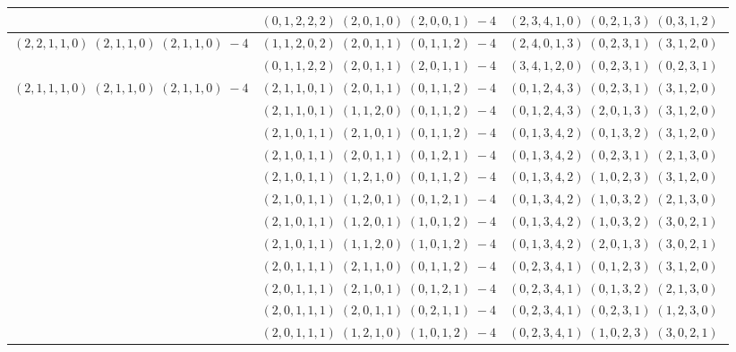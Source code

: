\documentclass[11pt]{article}
\begin{document}
\begin{longtable}[l]{|c|c|c|}
 \cline{2-3} 
 & $(0 ,1 ,2 ,2 ,2) \;(2 ,0 ,1 ,0) \;(2 ,0 ,0 ,1) \;-4$ & $(2 ,3 ,4 ,1 ,0) \;(0 ,2 ,1 ,3) \;(0 ,3 ,1 ,2) \;$\\ \hline\multirow[t]{2}{*}{ $(2 ,2 ,1 ,1 ,0) \;(2 ,1 ,1 ,0) \;(2 ,1 ,1 ,0) \;-4$ }  & $(1 ,1 ,2 ,0 ,2) \;(2 ,0 ,1 ,1) \;(0 ,1 ,1 ,2) \;-4$ & $(2 ,4 ,0 ,1 ,3) \;(0 ,2 ,3 ,1) \;(3 ,1 ,2 ,0) \;$\\ 
 \cline{2-3} 
 & $(0 ,1 ,1 ,2 ,2) \;(2 ,0 ,1 ,1) \;(2 ,0 ,1 ,1) \;-4$ & $(3 ,4 ,1 ,2 ,0) \;(0 ,2 ,3 ,1) \;(0 ,2 ,3 ,1) \;$\\ \hline\multirow[t]{38}{*}{ $(2 ,1 ,1 ,1 ,0) \;(2 ,1 ,1 ,0) \;(2 ,1 ,1 ,0) \;-4$ }  & $(2 ,1 ,1 ,0 ,1) \;(2 ,0 ,1 ,1) \;(0 ,1 ,1 ,2) \;-4$ & $(0 ,1 ,2 ,4 ,3) \;(0 ,2 ,3 ,1) \;(3 ,1 ,2 ,0) \;$\\ 
 \cline{2-3} 
 & $(2 ,1 ,1 ,0 ,1) \;(1 ,1 ,2 ,0) \;(0 ,1 ,1 ,2) \;-4$ & $(0 ,1 ,2 ,4 ,3) \;(2 ,0 ,1 ,3) \;(3 ,1 ,2 ,0) \;$\\ 
 \cline{2-3} 
 & $(2 ,1 ,0 ,1 ,1) \;(2 ,1 ,0 ,1) \;(0 ,1 ,1 ,2) \;-4$ & $(0 ,1 ,3 ,4 ,2) \;(0 ,1 ,3 ,2) \;(3 ,1 ,2 ,0) \;$\\ 
 \cline{2-3} 
 & $(2 ,1 ,0 ,1 ,1) \;(2 ,0 ,1 ,1) \;(0 ,1 ,2 ,1) \;-4$ & $(0 ,1 ,3 ,4 ,2) \;(0 ,2 ,3 ,1) \;(2 ,1 ,3 ,0) \;$\\ 
 \cline{2-3} 
 & $(2 ,1 ,0 ,1 ,1) \;(1 ,2 ,1 ,0) \;(0 ,1 ,1 ,2) \;-4$ & $(0 ,1 ,3 ,4 ,2) \;(1 ,0 ,2 ,3) \;(3 ,1 ,2 ,0) \;$\\ 
 \cline{2-3} 
 & $(2 ,1 ,0 ,1 ,1) \;(1 ,2 ,0 ,1) \;(0 ,1 ,2 ,1) \;-4$ & $(0 ,1 ,3 ,4 ,2) \;(1 ,0 ,3 ,2) \;(2 ,1 ,3 ,0) \;$\\ 
 \cline{2-3} 
 & $(2 ,1 ,0 ,1 ,1) \;(1 ,2 ,0 ,1) \;(1 ,0 ,1 ,2) \;-4$ & $(0 ,1 ,3 ,4 ,2) \;(1 ,0 ,3 ,2) \;(3 ,0 ,2 ,1) \;$\\ 
 \cline{2-3} 
 & $(2 ,1 ,0 ,1 ,1) \;(1 ,1 ,2 ,0) \;(1 ,0 ,1 ,2) \;-4$ & $(0 ,1 ,3 ,4 ,2) \;(2 ,0 ,1 ,3) \;(3 ,0 ,2 ,1) \;$\\ 
 \cline{2-3} 
 & $(2 ,0 ,1 ,1 ,1) \;(2 ,1 ,1 ,0) \;(0 ,1 ,1 ,2) \;-4$ & $(0 ,2 ,3 ,4 ,1) \;(0 ,1 ,2 ,3) \;(3 ,1 ,2 ,0) \;$\\ 
 \cline{2-3} 
 & $(2 ,0 ,1 ,1 ,1) \;(2 ,1 ,0 ,1) \;(0 ,1 ,2 ,1) \;-4$ & $(0 ,2 ,3 ,4 ,1) \;(0 ,1 ,3 ,2) \;(2 ,1 ,3 ,0) \;$\\ 
 \cline{2-3} 
 & $(2 ,0 ,1 ,1 ,1) \;(2 ,0 ,1 ,1) \;(0 ,2 ,1 ,1) \;-4$ & $(0 ,2 ,3 ,4 ,1) \;(0 ,2 ,3 ,1) \;(1 ,2 ,3 ,0) \;$\\ 
 \cline{2-3} 
 & $(2 ,0 ,1 ,1 ,1) \;(1 ,2 ,1 ,0) \;(1 ,0 ,1 ,2) \;-4$ & $(0 ,2 ,3 ,4 ,1) \;(1 ,0 ,2 ,3) \;(3 ,0 ,2 ,1) \;$\\ 

\end{longtable}
\end{document}

